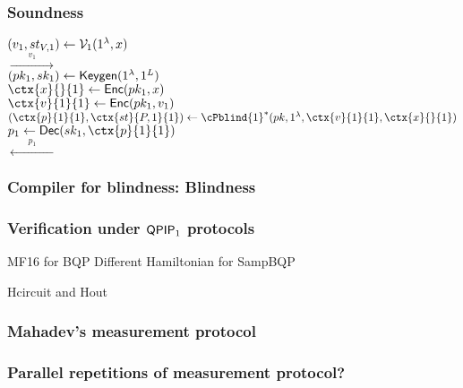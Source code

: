 \documentclass{beamer}
\begin{document}
\begin{frame}
	\frametitle{Soundness}
	$(v_1, st_{V, 1})\leftarrow\mathcal{V}_1(1^\lambda, x)$
	\pause
	\\\hspace*{\fill}$\xrightarrow{\qquad v_1\qquad}$\hspace*{\fill}
	\pause
	\\\hspace*{\fill}$(pk_1, sk_1)\leftarrow\mathsf{Keygen}(1^\lambda, 1^L)$
	\pause
	\\\hspace*{\fill}$\ctx{x}{}{1}\leftarrow\Enc(pk_1, x)$
	\pause
	\\\hspace*{\fill}$\ctx{v}{1}{1}\leftarrow\Enc(pk_1, v_1)$
	\pause
	\\\hspace*{\fill}$(\ctx{p}{1}{1}, \ctx{st}{P, 1}{1})\leftarrow\cPblind{1}^*(pk, 1^\lambda, \ctx{v}{1}{1}, \ctx{x}{}{1})$
	\pause
	\\\hspace*{\fill}$p_1\leftarrow\Dec(sk_1, \ctx{p}{1}{1})$
	\pause
	\\\hspace*{\fill}$\xleftarrow{\qquad p_1\qquad}$\hspace*{\fill}
\end{frame}

\begin{frame}
	\frametitle{Compiler for blindness: Blindness}

\end{frame}

\begin{frame}
	\frametitle{Verification under $\operatorname{\mathsf{QPIP}}_1$ protocols}
	MF16 for BQP
	Different Hamiltonian for SampBQP

	Hcircuit and Hout
\end{frame}

\begin{frame}
	\frametitle{Mahadev's measurement protocol}

\end{frame}

\begin{frame}
	\frametitle{Parallel repetitions of measurement protocol?}

\end{frame}
\end{document}
